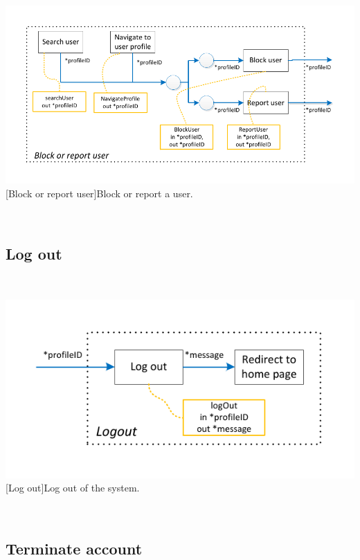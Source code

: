 \documentclass[11pt, a4paper,svglistings,oneside]{book}
\begin{document}
$\;$ \\
\noindent\begin{minipage}{\textwidth}
    \centering
   \includegraphics[scale=1]{nav_BlockReport.pdf}
 [Block or report user]{Block or report a user.}
\end{minipage}
$\;$ \\ 

\subsection{Log out}

$\;$ \\
\noindent\begin{minipage}{\textwidth}
    \centering
   \includegraphics[scale=1]{nav_LogOff.pdf}
 [Log out]{Log out of the system.}
\end{minipage}
$\;$ \\ 

\subsection{Terminate account}
\end{document}
